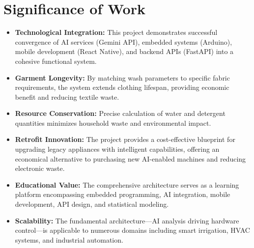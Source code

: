 \section{Significance of Work}
\begin{itemize}
    \item \textbf{Technological Integration:} This project demonstrates successful convergence of AI services (Gemini API), embedded systems (Arduino), mobile development (React Native), and backend APIs (FastAPI) into a cohesive functional system.
    \item \textbf{Garment Longevity:} By matching wash parameters to specific fabric requirements, the system extends clothing lifespan, providing economic benefit and reducing textile waste.
    \item \textbf{Resource Conservation:} Precise calculation of water and detergent quantities minimizes household waste and environmental impact.
    \item \textbf{Retrofit Innovation:} The project provides a cost-effective blueprint for upgrading legacy appliances with intelligent capabilities, offering an economical alternative to purchasing new AI-enabled machines and reducing electronic waste.
    \item \textbf{Educational Value:} The comprehensive architecture serves as a learning platform encompassing embedded programming, AI integration, mobile development, API design, and statistical modeling.
    \item \textbf{Scalability:} The fundamental architecture—AI analysis driving hardware control—is applicable to numerous domains including smart irrigation, HVAC systems, and industrial automation.
\end{itemize}